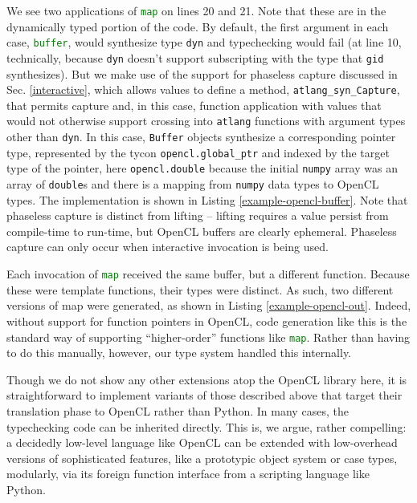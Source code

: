 \documentclass[9pt]{sigplanconf}
\newcommand{\lstinlinep}[1]{\lstinline[language=Python,basicstyle=\ttfamily\small,deletendkeywords={tuple,buffer,map}]{#1}}
\begin{document}
We see two applications of \lstinlinep{map} on lines 20 and 21. Note that these are in the dynamically typed portion of the code. By default, the first argument in each case, \lstinlinep{buffer}, would synthesize type \lstinlinep{dyn} and typechecking would fail (at line 10, technically, because \lstinlinep{dyn} doesn't support subscripting with the type that \lstinlinep{gid} synthesizes).  But we make use of the support for phaseless capture discussed in Sec. \ref{interactive}, which allows values to define a method, \lstinlinep{atlang_syn_Capture}, that permits capture and, in this case, function application with values that would not otherwise support crossing into \lstinlinep{atlang} functions with argument types other than \lstinlinep{dyn}. In this case, \lstinlinep{Buffer} objects synthesize a corresponding pointer type, represented by the tycon \lstinlinep{opencl.global_ptr} and indexed by the target type of the pointer, here \lstinlinep{opencl.double} because the initial \lstinlinep{numpy} array was an array of \lstinlinep{double}s and there is a mapping from \lstinlinep{numpy} data types to OpenCL types. The implementation is shown in Listing \ref{example-opencl-buffer}. Note that phaseless capture is distinct from lifting -- lifting requires a value persist from compile-time to run-time, but OpenCL buffers are clearly ephemeral. Phaseless capture can only occur when interactive invocation is being used.

Each invocation of \lstinlinep{map} received the same buffer, but a different function. Because these were template functions, their types were distinct. As such, two different versions of map were generated, as shown in Listing \ref{example-opencl-out}. Indeed, without support for function pointers in OpenCL, code generation like this is the standard way of supporting ``higher-order'' functions like \lstinlinep{map}. Rather than having to do this manually, however, our type system handled this internally. 

Though we do not show any other extensions atop the OpenCL library here, it is straightforward to implement variants of those described above that target their translation phase to OpenCL rather than Python. In many cases, the typechecking code can be inherited directly. This is, we argue, rather compelling: a decidedly low-level language like OpenCL can be extended with low-overhead versions of sophisticated features, like a prototypic object system or case types, modularly, via its foreign function interface from a scripting language like Python.
\end{document}
